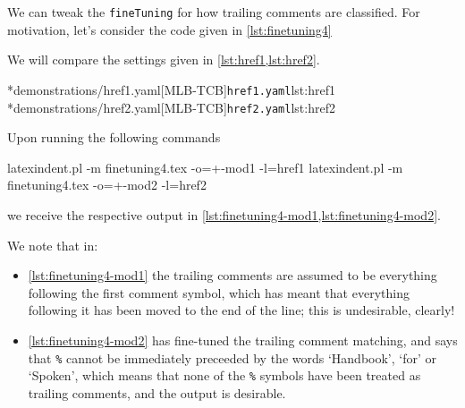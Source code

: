 \begin{example}
We can tweak the \texttt{fineTuning} for how trailing comments are classified. For motivation, let's consider
the code given in \cref{lst:finetuning4}


     We will compare the settings given in \cref{lst:href1,lst:href2}.

	 \begin{cmhtcbraster}[raster column skip=.01\linewidth,
			 raster left skip=0cm,
           raster right skip=-0.5cm,]
         \cmhlistingsfromfile*[style=yaml-LST]*{demonstrations/href1.yaml}[MLB-TCB]{\texttt{href1.yaml}}{lst:href1}
		 \cmhlistingsfromfile*[style=yaml-LST]*{demonstrations/href2.yaml}[MLB-TCB]{\texttt{href2.yaml}}{lst:href2}
	 \end{cmhtcbraster}

     Upon running the following commands
	 \begin{commandshell}
latexindent.pl -m finetuning4.tex -o=+-mod1 -l=href1
latexindent.pl -m finetuning4.tex -o=+-mod2 -l=href2
\end{commandshell}
we receive the respective output in \cref{lst:finetuning4-mod1,lst:finetuning4-mod2}.

\begin{widepage}

\end{widepage}

         We note that in:
         \begin{itemize}
           \item \cref{lst:finetuning4-mod1} the trailing comments are assumed to be everything following the first comment symbol, which 
             has meant that everything following it has been moved to the end of the line; this is undesirable, clearly!
           \item \cref{lst:finetuning4-mod2} has fine-tuned the trailing comment matching, and says that \lstinline!%! cannot
             be immediately preceeded by the words `Handbook', `for' or `Spoken', which means that none of the \lstinline!%! 
             symbols have been treated as trailing comments, and the output is desirable.
         \end{itemize}
\end{example}
